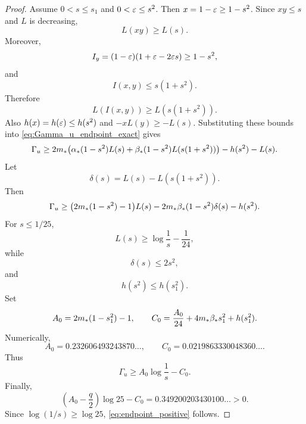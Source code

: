 \begin{proof}
Assume \(0<s\le s_1\) and \(0<\varepsilon\le s^2\).  Then \(x=1-\varepsilon\geq 1-s^2\).  Since \(xy\le s\) and \(L\) is decreasing,
\begin{equation}\label{eq:Lxy_bound}
  L(xy)\ge L(s).
\end{equation}
Moreover,
\begin{equation}\label{eq:Iy_lower}
  I_y=(1-\varepsilon)(1+\varepsilon-2\varepsilon s)\geq 1-s^2,
\end{equation}
and
\begin{equation}\label{eq:I_upper_endpoint}
  I(x,y)\le s(1+s^2).
\end{equation}
Therefore
\begin{equation}\label{eq:LI_bound}
  L(I(x,y))\ge L(s(1+s^2)).
\end{equation}
Also \(h(x)=h(\varepsilon)\le h(s^2)\) and \(-xL(y)\ge -L(s)\).  Substituting these bounds into \eqref{eq:Gamma_u_endpoint_exact} gives
\begin{equation}\label{eq:Gamma_u_lower_endpoint}
  \Gamma_u\ge
  2m_*\bigl(\alpha_*(1-s^2)L(s)+\beta_*(1-s^2)L(s(1+s^2))\bigr)-h(s^2)-L(s).
\end{equation}
Let
\begin{equation}\label{eq:delta_s}
  \delta(s)=L(s)-L(s(1+s^2)).
\end{equation}
Then
\begin{equation}\label{eq:Gamma_u_delta}
  \Gamma_u\ge
  \bigl(2m_*(1-s^2)-1\bigr)L(s)-2m_*\beta_*(1-s^2)\delta(s)-h(s^2).
\end{equation}
For \(s\le1/25\),
\begin{equation}\label{eq:L_s_lower}
  L(s)\ge\log\frac1s-\frac1{24},
\end{equation}
while
\begin{equation}\label{eq:delta_bound}
  \delta(s)\le2s^2,
\end{equation}
and
\begin{equation}\label{eq:h_s2_bound}
  h(s^2)\le h(s_1^2).
\end{equation}
Set
\begin{equation}\label{eq:A0_C0}
  A_0=2m_*(1-s_1^2)-1,
  \qquad
  C_0=\frac{A_0}{24}+4m_*\beta_* s_1^2+h(s_1^2).
\end{equation}
Numerically,
\begin{equation}\label{eq:A0C0num}
  A_0=0.232606493243870\ldots,
  \qquad
  C_0=0.0219863330048360\ldots .
\end{equation}
Thus
\begin{equation}\label{eq:Gamma_u_A0}
  \Gamma_u\ge A_0\log\frac1s-C_0.
\end{equation}
Finally,
\begin{equation}\label{eq:endpoint_margin}
  \left(A_0-\frac q2\right)\log25-C_0=0.349200203430100\ldots>0.
\end{equation}
Since \(\log(1/s)\ge\log25\), \eqref{eq:endpoint_positive} follows.
\end{proof}

